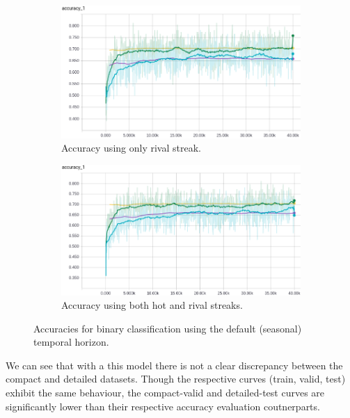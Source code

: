\documentclass{article} %
\begin{document}
\begin{figure}[!htb]
  \begin{subfigure}{0.5\textwidth}
    \includegraphics[width=\linewidth]{plots/model1/symmetrical/streak-r/accuracy.png}
    \caption{Accuracy using only rival streak.}\label{fig:symmetrical-r-accuracy}
  \end{subfigure}
  \begin{subfigure}{0.5\textwidth}
    \includegraphics[width=\linewidth]{plots/model1/symmetrical/streak-hr/accuracy.png}
    \caption{Accuracy using both hot and rival streaks.}\label{fig:symmetrical-hr-accuracy}
  \end{subfigure}
  \caption{Accuracies for binary classification using the default (seasonal) temporal horizon.}
  \label{fig:symmetrical-accuracies}
\end{figure}

We can see that with a this model there is not a clear discrepancy between the compact and detailed datasets.
Though the respective curves (train, valid, test) exhibit the same behaviour, the compact-valid and detailed-test curves are significantly lower than their respective accuracy evaluation coutnerparts.
\end{document}
